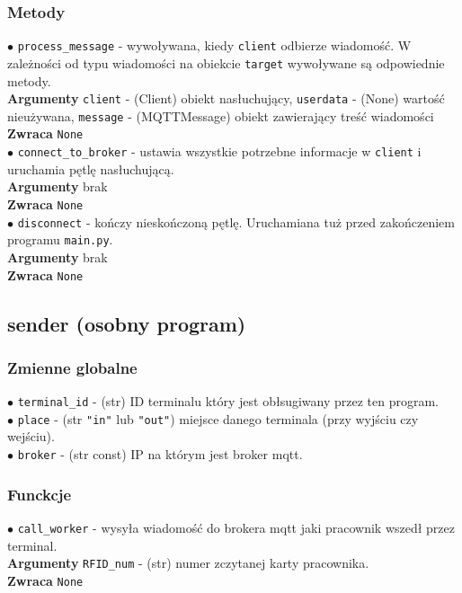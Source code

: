 \documentclass{article}
\begin{document}
\subsubsection{Metody}
\hspace{0.13in}
$\bullet$ \texttt{process\_message} - wywoływana, kiedy 
\texttt{client} odbierze wiadomość. W zależności od typu wiadomości
na obiekcie \texttt{target} wywoływane są odpowiednie metody. \\
\textbf{Argumenty} \texttt{client} - (Client) obiekt nasłuchujący,
\texttt{userdata} - (None) wartość nieużywana, 
\texttt{message} - (MQTTMessage) obiekt zawierający treść wiadomości\\
\textbf{Zwraca} \texttt{None} \\

$\bullet$ \texttt{connect\_to\_broker} - ustawia wszystkie 
potrzebne informacje w \texttt{client} i uruchamia 
pętlę nasłuchującą. \\
\textbf{Argumenty} brak \\
\textbf{Zwraca} \texttt{None} \\

$\bullet$ \texttt{disconnect} - kończy nieskończoną pętlę. Uruchamiana
tuż przed zakończeniem programu \texttt{main.py}. \\
\textbf{Argumenty} brak \\
\textbf{Zwraca} \texttt{None} \\

\subsection{sender (osobny program)}
\subsubsection{Zmienne globalne}
$\bullet$ \texttt{terminal\_id} - (str) ID terminalu który jest 
obłsugiwany przez ten program. \\
$\bullet$ \texttt{place} - (str \texttt{"in"} lub \texttt{"out"}) 
miejsce danego terminala (przy wyjściu czy wejściu). \\
$\bullet$ \texttt{broker} - (str const) IP na którym jest broker 
mqtt.

\subsubsection{Funckcje}

\hspace{0.13in}
$\bullet$ \texttt{call\_worker} - wysyła wiadomość do brokera mqtt 
jaki pracownik wszedł przez terminal.\\
\textbf{Argumenty} \texttt{RFID\_num} - (str) numer zczytanej karty
pracownika. \\
\textbf{Zwraca} \texttt{None} \\
\end{document}
